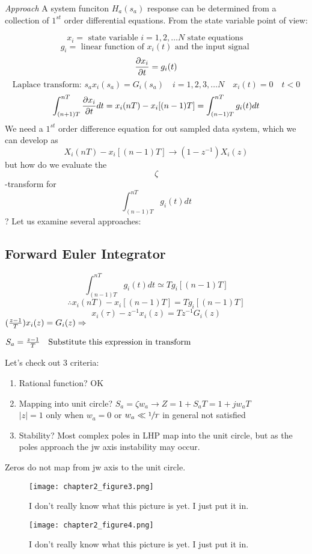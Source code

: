 \documentclass[11pt,fleqn]{book} %
\begin{document}
\textit{Approach}
A system funciton $H_a(s_a)$ response can be determined from a collection of $1^{st}$ order differential equations. From the state variable point of view:

$$x_i=\text{ state variable }i = 1, 2, \dots N \text{ state equations }$$
$$g_i = \text{ linear function of }x_i(t) \text{ and the input signal }$$
$${\partial x_i\over \partial t}=g_i(t)$$
$$\text{Laplace transform: }s_ax_i(s_a)=G_i(s_a)\quad i=1,2,3,\dots N\quad x_i(t)=0\quad t<0$$
$$\int_{(n+1)T}^{nT}{\partial x_i\over\partial t} dt=x_i(nT)-x_i[(n-1)T]=\int_{(n-1)T}^{nT}g_i(t)dt$$
We need a $1^{st}$ order difference equation for out sampled data system, which we can develop as
$$X_i(nT)-x_i[(n-1)T]\to(1-z^{-1})X_i(z)$$
but how do we evaluate the $$\zeta$$-transform for $$\int_{(n-1)T}^{nT}g_i(t)dt$$?
Let us examine several approaches:

\subsection{Forward Euler Integrator}

$$\int_{(n-1)T}^{nT}g_i(t)dt\simeq Tg_i[(n-1)T]$$
$$\therefore x_i(nT)-x_i[(n-1)T]=Tg_i[(n-1)T]$$
$$x_i(\tau)-z^{-1}x_i(z)=Tz^{-1}G_i(z)$$
$({z-1\over T})x_i(z)=G_i(z)\Rightarrow$
\begin{tcolorbox}
  ${S_a={z-1\over T}\quad\text{Substitute this expression in transform}}$
\end{tcolorbox}

Let's check out 3 criteria:

\begin{enumerate}
  \item Rational function? OK
  \item Mapping into unit circle? $S_a=\zeta w_a\to Z=1+S_aT=1+jw_aT$\\
  $|z|=1$ only when $w_a=0$ or $w_a\ll\sfrac{1}{T}$ in general not satisfied
  \item Stability? Most complex poles in LHP map into the unit circle, but as the poles approach the jw axis instability may occur.
\end{enumerate}
Zeros do not map from jw axis to the unit circle.

\begin{figure}[h]
  \centering\texttt{[image: chapter2\_figure3.png]}
  \caption{I don't really know what this picture is yet. I just put it in.}
\end{figure}

\begin{figure}[h]
  \centering\texttt{[image: chapter2\_figure4.png]}
  \caption{I don't really know what this picture is yet. I just put it in.}
\end{figure}
\end{document}

